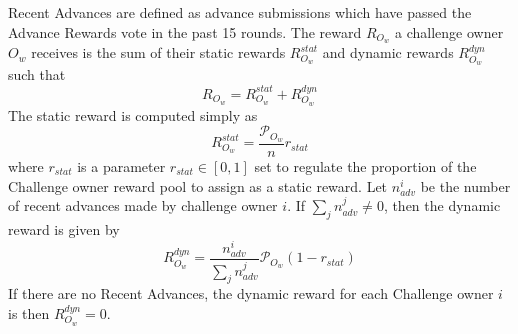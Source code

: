 \documentclass{contract}
\numberwithin{equation}{section}
\begin{document}
Recent Advances are defined as advance submissions which have passed the Advance Rewards vote in the past 15 rounds. 
The reward $R_{O_w}$ a challenge owner $O_w$ receives is the sum of their static rewards $R^{stat}_{O_w}$ and dynamic rewards $R^{dyn}_{O_w}$ such that 
\begin{equation}
    R_{O_w} = R^{stat}_{O_w} + R^{dyn}_{O_w} 
\end{equation}
The static reward is computed simply as
\begin{equation}
    R^{stat}_{O_w} = \frac{\mathcal{P}_{O_w}}{n}r_{stat}
\end{equation}
where $r_{stat}$ is a parameter $r_{stat}\in[0,1]$ set to regulate the proportion of the Challenge owner reward pool to assign as a static reward. 
Let $n^i_{adv}$ be the number of recent advances made by challenge owner $i$.
If $\sum_j n^j_{adv} \neq 0$, then the dynamic reward is given by 
\begin{equation}
    R^{dyn}_{O_w} = \frac{n^i_{adv}}{\sum_{j}n^j_{adv}} \mathcal{P}_{O_w}(1-r_{stat})
\end{equation}
If there are no Recent Advances, the dynamic reward for each Challenge owner $i$ is then $R^{dyn}_{O_w} = 0$.




\pagebreak

\appendix

\end{document}
